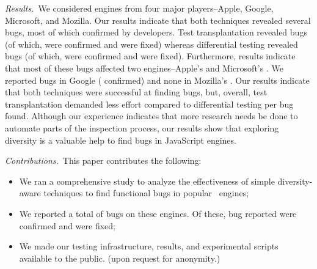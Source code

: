 \documentclass[10pt,conference,anonymous]{IEEEtran}
\begin{document}


\emph{Results.}~We considered engines from four major players--Apple,
Google, Microsoft, and Mozilla. Our results indicate that both
techniques revealed several bugs, most of which confirmed by
developers. Test transplantation revealed \noBugsTransplantation{}
bugs (of which, \noBugsTransplantationConfirmed{} were confirmed and
\noBugsTransplantationFixed{} were fixed) whereas differential testing
revealed \noBugsDifferentialTesting{} bugs (of which,
\noBugsDifferentialTestingConfirmed{} were confirmed and
\noBugsDifferentialTestingFixed{} were fixed). Furthermore, results
indicate that most of these bugs affected two engines--Apple's \jsc{}
and Microsoft's \chakra{}.  We reported \noBugsBugsReportedGoogle{}
bugs in Google \veight{} (\noBugsBugsConfirmedGoogle{} confirmed) and
none in Mozilla's \smonkey{}. Our results indicate that both
techniques were successful at finding bugs, but, overall, test
transplantation demanded less effort compared to differential testing
per bug found. Although our experience indicates that more research
needs be done to automate parts of the inspection process, our results
show that exploring diversity is a valuable help to find bugs in
JavaScript engines.


\emph{Contributions.}~This paper contributes the following:
\begin{itemize}
  \item We ran a comprehensive study to analyze the effectiveness of
    simple diversity-aware techniques to find functional bugs in
     popular \js\ engines;
    
  \item We reported a total of \totalBugsReported{} bugs on these
    engines. Of these, \totalBugsConfirmed{} bug reported were confirmed and
    \totalBugsFixed{} were fixed;
    
    
  \item We made our testing infrastructure, results, and experimental
    scripts available to the public. (upon request for anonymity.)

\end{itemize}
\end{document}
